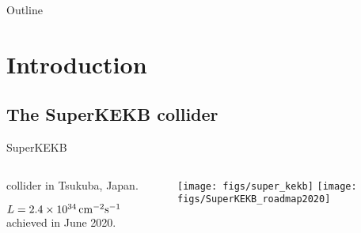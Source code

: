 \def\bdto {BDT$_1$\xspace}
\def\bdtt {BDT$_2$\xspace}
\def\bdtoff {BDT$_{\mathrm{c}}$\xspace}

\def\lumiyfours         {62.9\,\invfb\xspace} %
\def\lumioff            {9.2\,\invfb\xspace} %
\begin{frame}{Outline}
 \tableofcontents
\end{frame}
\section{Introduction}
\subsection{The SuperKEKB collider}
\begin{frame}{SuperKEKB}
\begin{columns}
\begin{column}{0.48\linewidth} 
\bi \small
\item{\epem collider in Tsukuba, Japan.}
\bi
\item{$L=2.4\times10^{34}{\rm \,cm}^{-2} {\rm s}^{-1}$ achieved in June 2020.}
\ei
\ei
\end{column}
\begin{column}{0.52\linewidth}
\centering
\texttt{[image: figs/super\_kekb]}
\texttt{[image: figs/SuperKEKB\_roadmap2020]}
\end{column}
\end{columns}
\end{frame}
